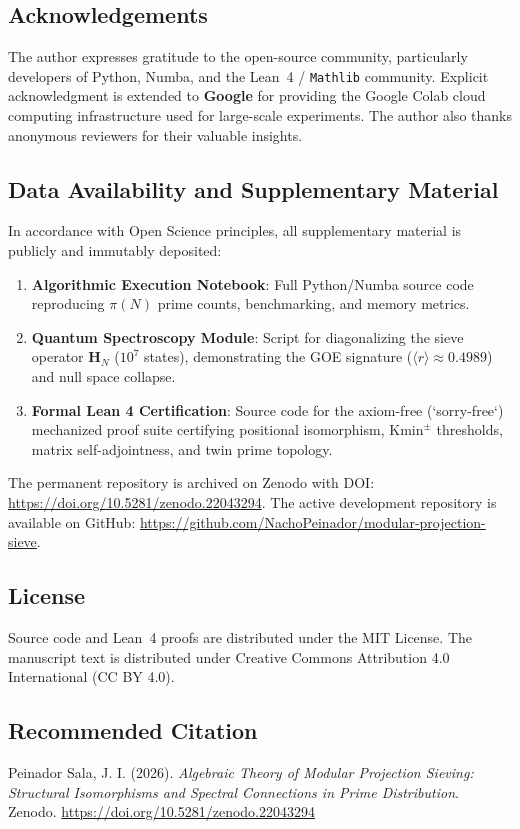 \documentclass{article}
\numberwithin{equation}{section}
\theoremstyle{plain}
\theoremstyle{definition}
\begin{document}
\subsection*{Acknowledgements}
The author expresses gratitude to the open-source community, particularly developers of Python, Numba, and the Lean~4 / \texttt{Mathlib} community. Explicit acknowledgment is extended to \textbf{Google} for providing the Google Colab cloud computing infrastructure used for large-scale experiments. The author also thanks anonymous reviewers for their valuable insights.

\subsection*{Data Availability and Supplementary Material}
\label{sec:disponibilidad}

In accordance with Open Science principles, all supplementary material is publicly and immutably deposited:

\begin{enumerate}
    \item \textbf{Algorithmic Execution Notebook}: Full Python/Numba source code reproducing $\pi(N)$ prime counts, benchmarking, and memory metrics.
    \item \textbf{Quantum Spectroscopy Module}: Script for diagonalizing the sieve operator $\mathbf{H}_N$ ($10^7$ states), demonstrating the GOE signature ($\langle r \rangle \approx 0.4989$) and null space collapse.
    \item \textbf{Formal Lean 4 Certification}: Source code for the axiom-free (`sorry-free`) mechanized proof suite certifying positional isomorphism, $\mathrm{Kmin}^\pm$ thresholds, matrix self-adjointness, and twin prime topology.
\end{enumerate}

The permanent repository is archived on Zenodo with DOI: \url{https://doi.org/10.5281/zenodo.22043294}. The active development repository is available on GitHub: \url{https://github.com/NachoPeinador/modular-projection-sieve}.

\subsection*{License}
Source code and Lean~4 proofs are distributed under the MIT License. The manuscript text is distributed under Creative Commons Attribution 4.0 International (CC BY 4.0).

\subsection*{Recommended Citation}
Peinador Sala, J. I. (2026). \textit{Algebraic Theory of Modular Projection Sieving: Structural Isomorphisms and Spectral Connections in Prime Distribution}. Zenodo. \url{https://doi.org/10.5281/zenodo.22043294}
\end{document}
